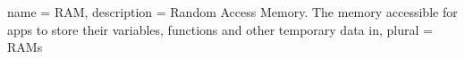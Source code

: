 {
  name = RAM,
  description = {Random Access Memory. The memory accessible for apps to store their variables, functions and other temporary data in},
  plural = RAMs
}
